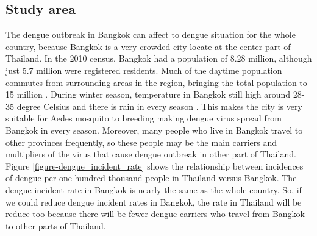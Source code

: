 \documentclass[review]{elsarticle}
\begin{document}
\subsection{Study area}
\label{section-study-area}

The dengue outbreak in Bangkok can affect to dengue situation for the whole country, because Bangkok is a very crowded city  locate at the center part of Thailand. In the 2010 census, Bangkok had a population of 8.28 million, although just 5.7 million were registered residents. Much of the daytime population commutes from surrounding areas in the region, bringing the total population to 15 million \cite{WPR2015}. During winter season, temperature in Bangkok still high around 28-35 degree Celsius and there is rain in every season \cite {wwo2012}. %
This makes the city is very suitable for Aedes mosquito to breeding making dengue virus spread from  Bangkok in every season. Moreover, many people who live in Bangkok travel to other provinces frequently, so these people may be the main carriers and multipliers of the virus that cause dengue outbreak in other part of Thailand. Figure \ref{figure-dengue_incident_rate} shows the relationship between incidences of dengue per one hundred thousand people in Thailand versus Bangkok. The dengue incident rate in Bangkok is nearly the same as the whole country. So, if we could reduce dengue incident rates in Bangkok, the rate in Thailand will be reduce too because there will be fewer dengue carriers who travel from Bangkok to other parts of Thailand.

%
\end{document}
